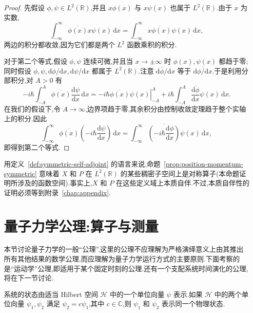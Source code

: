 \begin{proof}
先假设 \(\phi,\psi\in L^{2}(\mathbb{R})\),并且 \(x\phi(x)\) 与 \(x\psi(x)\) 也属于 \(L^{2}(\mathbb{R})\).由于 \(x\) 为实数,
\[
\int_{-\infty}^{\infty}\overline{\phi(x)}x\psi(x)\,\mathrm{d}x
=\int_{-\infty}^{\infty}\overline{x\phi(x)}\psi(x)\,\mathrm{d}x,
\]
两边的积分都收敛,因为它们都是两个 \(L^{2}\) 函数乘积的积分.

对于第二个等式,假设 \(\phi,\psi\) 连续可微,并且当 \(x\to\pm\infty\) 时 \(\phi(x),\psi(x)\) 都趋于零;同时假设 \(\phi,\psi,\mathrm{d}\phi/\mathrm{d}x,\mathrm{d}\psi/\mathrm{d}x\) 都属于 \(L^{2}(\mathbb{R})\).注意 \(\mathrm{d}\overline{\phi}/\mathrm{d}x\) 等于 \(\overline{\mathrm{d}\phi/\mathrm{d}x}\).于是利用分部积分,对 \(A>0\) 有
\[
-i\hbar\int_{-A}^{A}\overline{\phi(x)}\frac{\mathrm{d}\psi}{\mathrm{d}x}\,\mathrm{d}x
=-i\hbar\left.\overline{\phi(x)}\psi(x)\right|_{-A}^{A}
+i\hbar\int_{-A}^{A}\overline{\frac{\mathrm{d}\phi}{\mathrm{d}x}}\psi(x)\,\mathrm{d}x.
\]
在我们的假设下,令 \(A\to\infty\),边界项趋于零,其余积分由控制收敛定理趋于整个实轴上的积分.因此
\[
\int_{-\infty}^{\infty}\overline{\phi(x)}
\left(-i\hbar\frac{\mathrm{d}\psi}{\mathrm{d}x}\right)\,\mathrm{d}x
=\int_{-\infty}^{\infty}
\overline{\left(-i\hbar\frac{\mathrm{d}\phi}{\mathrm{d}x}\right)}\psi(x)\,\mathrm{d}x,
\]
即得到第二个等式.
\end{proof}

用定义~\ref{def:symmetric-self-adjoint} 的语言来说,命题~\ref{prop:position-momentum-symmetric} 意味着 \(X\) 和 \(P\) 在 \(L^{2}(\mathbb{R})\) 的某些稠密子空间上是对称算子(本命题证明所涉及的函数空间).事实上,\(X\) 和 \(P\) 在这些定义域上本质自伴.不过,本质自伴性的证明必须等到附录~\ref{chap:appendix}.

\section{量子力学公理:算子与测量}\label{sec:quantum-axioms}

本节讨论量子力学的一般“公理”.这里的公理不应理解为严格演绎意义上由其推出所有其他结果的数学公理,而应理解为量子力学运行方式的主要原则.下面考察的是“运动学”公理,即适用于某个固定时刻的公理.还有一个支配系统时间演化的公理,将在下一节讨论.

\begin{axiom}[公理 1:状态]\label{ax:quantum-state}
系统的状态由适当 Hilbert 空间 \(\mathcal{H}\) 中的一个单位向量 \(\psi\) 表示.如果 \(\mathcal{H}\) 中的两个单位向量 \(\psi_{1},\psi_{2}\) 满足 \(\psi_{2}=c\psi_{1}\),其中 \(c\in\mathbb{C}\),则 \(\psi_{1}\) 和 \(\psi_{2}\) 表示同一个物理状态.
\end{axiom}

